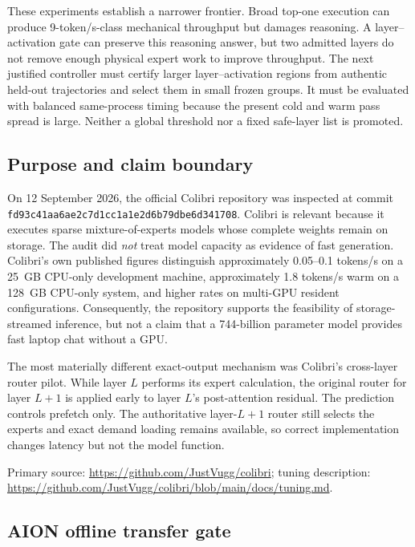 These experiments establish a narrower frontier.  Broad top-one execution can
produce 9-token/s-class mechanical throughput but damages reasoning.  A
layer--activation gate can preserve this reasoning answer, but two admitted
layers do not remove enough physical expert work to improve throughput.  The
next justified controller must certify larger layer--activation regions from
authentic held-out trajectories and select them in small frozen groups.  It
must be evaluated with balanced same-process timing because the present cold
and warm pass spread is large.  Neither a global threshold nor a fixed
safe-layer list is promoted.
\subsection{Purpose and claim boundary}

On 12 September 2026, the official Colibri repository was inspected at commit
\texttt{fd93c41aa6ae2c7d1cc1a1e2d6b79dbe6d341708}.  Colibri is relevant because
it executes sparse mixture-of-experts models whose complete weights remain on
storage.  The audit did \emph{not} treat model capacity as evidence of fast
generation.  Colibri's own published figures distinguish approximately
0.05--0.1 tokens/s on a 25~GB CPU-only development machine, approximately
1.8 tokens/s warm on a 128~GB CPU-only system, and higher rates on multi-GPU
resident configurations.  Consequently, the repository supports the
feasibility of storage-streamed inference, but not a claim that a 744-billion
parameter model provides fast laptop chat without a GPU.

The most materially different exact-output mechanism was Colibri's
cross-layer router pilot.  While layer $L$ performs its expert calculation,
the original router for layer $L+1$ is applied early to layer $L$'s
post-attention residual.  The prediction controls prefetch only.  The
authoritative layer-$L+1$ router still selects the experts and exact demand
loading remains available, so correct implementation changes latency but not
the model function.

Primary source: \url{https://github.com/JustVugg/colibri}; tuning description:
\url{https://github.com/JustVugg/colibri/blob/main/docs/tuning.md}.

\subsection{AION offline transfer gate}

